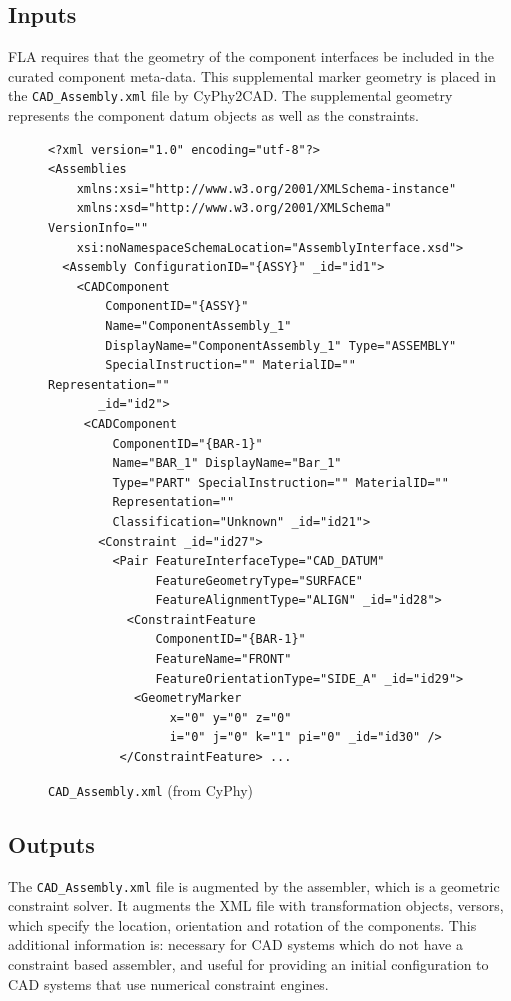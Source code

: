 \documentclass[]{report}
\begin{document}
\subsection{Inputs}

FLA requires that the geometry of the component interfaces be included in the curated component meta-data.  
This supplemental marker geometry is placed in the \texttt{CAD\_Assembly.xml} file by CyPhy2CAD.  
The supplemental geometry represents the component datum objects as well as the constraints.

\begin{figure}
\begin{lstlisting}
<?xml version="1.0" encoding="utf-8"?>
<Assemblies  
    xmlns:xsi="http://www.w3.org/2001/XMLSchema-instance" 
    xmlns:xsd="http://www.w3.org/2001/XMLSchema" VersionInfo=""     
    xsi:noNamespaceSchemaLocation="AssemblyInterface.xsd">
  <Assembly ConfigurationID="{ASSY}" _id="id1">
    <CADComponent  
        ComponentID="{ASSY}" 
        Name="ComponentAssembly_1"
        DisplayName="ComponentAssembly_1" Type="ASSEMBLY"
        SpecialInstruction="" MaterialID="" Representation=""
       _id="id2">
     <CADComponent 
         ComponentID="{BAR-1}" 
         Name="BAR_1" DisplayName="Bar_1"
         Type="PART" SpecialInstruction="" MaterialID=""
         Representation=""
         Classification="Unknown" _id="id21">
       <Constraint _id="id27">
         <Pair FeatureInterfaceType="CAD_DATUM"
               FeatureGeometryType="SURFACE"           
               FeatureAlignmentType="ALIGN" _id="id28">
           <ConstraintFeature 
               ComponentID="{BAR-1}" 
               FeatureName="FRONT"
               FeatureOrientationType="SIDE_A" _id="id29">
            <GeometryMarker 
                 x="0" y="0" z="0" 
                 i="0" j="0" k="1" pi="0" _id="id30" />
          </ConstraintFeature> ...
\end{lstlisting}
\caption{\texttt{CAD\_Assembly.xml} (from CyPhy)}
\end{figure}



\subsection{Outputs} 

The \texttt{CAD\_Assembly.xml} file is augmented by the assembler, which is a geometric constraint solver.  
It augments the XML file with transformation objects, versors, 
which specify the location, orientation and rotation of the components.
This additional information is:
necessary for CAD systems which do not have a constraint based assembler, and
useful for providing an initial configuration to CAD systems that use numerical constraint engines.
\end{document}
